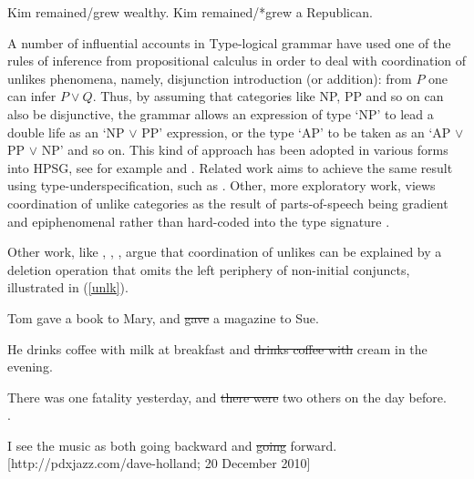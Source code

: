 \documentclass[output=paper]{langsci/langscibook}
\begin{document}
\begin{exe}
\ex
\begin{xlista}
\ex  Kim remained/grew wealthy.
\ex  Kim remained/*grew a Republican.
\end{xlista}\label{republican}
\end{exe}



\begin{exe}
\ex
\begin{xlista}
\end{xlista}\label{show2}
\end{exe}



A number of influential accounts in Type-logical grammar
\citep{morrill90,morrill94,bayer} have used one of the rules of
inference from propositional calculus in order to deal with
coordination of unlikes phenomena, namely, disjunction introduction
(or addition): from $P$ one can infer $P \vee Q$. 
Thus, by assuming that categories like NP, PP
and so on can also be disjunctive, the grammar allows an expression
of type `NP' to lead a double life as an `NP $\vee$ PP' expression,
or the type `AP' to be taken as an `AP $\vee$ PP $\vee$ NP' and so
on. This kind of approach has been adopted in various forms into HPSG, see for example \citet{Daniels02} and  \citet{Yatabe:04}.
Related work aims to achieve the same result using type-underspecification, such as 
 \citet{sag}. Other, more exploratory work, views coordination of unlike categories as the result of   parts-of-speech being gradient and  epiphenomenal rather than hard-coded into the type signature  \citep{bookivan}. 
 

Other work, like
 \citet{berthold0}, \citet{yatabe},  \citet{Beavers},
 \citet{chaves06}  argue that
coordination of unlikes can be explained by
a deletion operation that omits the left periphery of
non-initial conjuncts, illustrated in   (\ref{unlk}).


\begin{exe}
\ex
\begin{xlista}
\ex Tom gave a book to Mary, and \sout{gave} a magazine to Sue. 

\ex He drinks coffee with milk at breakfast and \sout{drinks coffee with} cream in the evening.\\ \citep{hudson84}

\ex There was one fatality yesterday, and \sout{there were} two others on the day
before.\\
\citep[339]{chavesthesis}.

\ex I see the music as both going backward and \sout{going} forward.\\
{\small [http://pdxjazz.com/dave-holland; 20 December 2010]}
\end{xlista}\label{unlk}
\end{exe}
\end{document}
